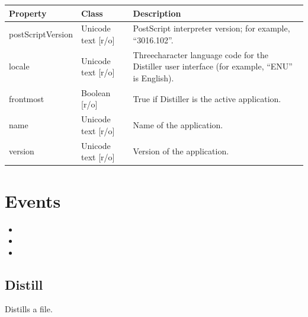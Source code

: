 \documentclass[letterpaper,12pt,english,openany,oneside]{sphinxmanual}
\begin{document}


\begin{savenotes}\sphinxattablestart
\centering
\begin{tabulary}{\linewidth}[t]{|T|T|T|}
\hline
\sphinxstyletheadfamily 
Property
&\sphinxstyletheadfamily 
Class
&\sphinxstyletheadfamily 
Description
\\
\hline
postScriptVersion
&
Unicode text {[}r/o{]}
&
PostScript interpreter version; for example, “3016.102”.
\\
\hline
locale
&
Unicode text {[}r/o{]}
&
Three\sphinxhyphen{}character language code for the Distiller user interface (for example, “ENU” is English).
\\
\hline
frontmost
&
Boolean {[}r/o{]}
&
True if Distiller is the active application.
\\
\hline
name
&
Unicode text {[}r/o{]}
&
Name of the application.
\\
\hline
version
&
Unicode text {[}r/o{]}
&
Version of the application.
\\
\hline
\end{tabulary}
\par
\sphinxattableend\end{savenotes}


\section{Events}
\label{\detokenize{Distiller_Mac:events}}\begin{itemize}
\item {} 

\item {} 

\item {} 

\end{itemize}




\subsection{Distill}
\label{\detokenize{Distiller_Mac:distill}}
Distills a file.


\begin{sphinxVerbatim}[commandchars=\\\{\}]
  \PYG{p}{[} \PYG{p}{]}

    \PYG{p}{[} \PYG{p}{]}
\end{sphinxVerbatim}
\end{document}
